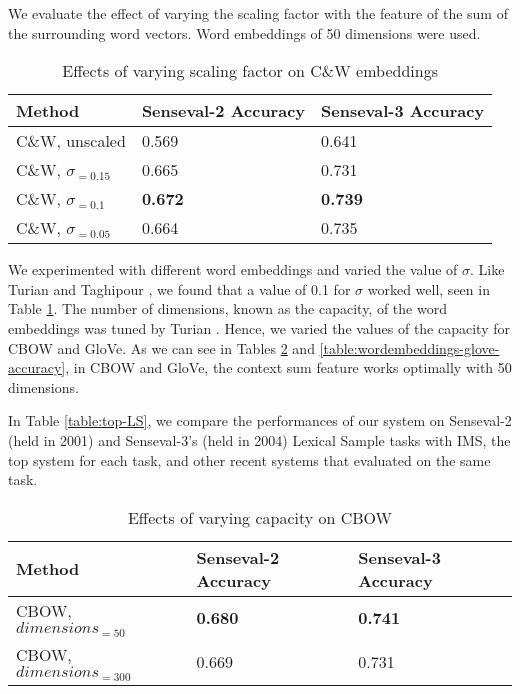 We evaluate the effect of varying the scaling factor with the feature of the sum of the surrounding word vectors. Word embeddings of 50 dimensions were used.



\begin{table}[ht]
	\caption{Effects of varying scaling factor on C\&W embeddings }
	\label{table:wordembeddings-accuracy}
	\begin{center}
		\begin{tabular}{| p{7cm} | p{4cm} | p{4cm} |}
			\hline
			Method & Senseval-2 Accuracy & Senseval-3 Accuracy \\
			\hline
			C\&W, unscaled & 0.569 & 0.641 \\
			\hline
			C\&W, $\sigma _{=0.15}$ & 0.665 & 0.731 \\
			\hline
			C\&W, $\sigma _{=0.1}$ & {\bf0.672} & {\bf0.739} \\
			\hline
			C\&W, $\sigma _{=0.05}$ & 0.664 & 0.735 \\
			\hline
			
		\end{tabular}
	\end{center}
\end{table}
We experimented with different word embeddings and varied the value of $\sigma$. Like Turian  and Taghipour , we found that a value of 0.1 for $\sigma$ worked well, seen in Table \ref{table:wordembeddings-accuracy}. The number of dimensions, known as the capacity, of the word embeddings was tuned by Turian . Hence, we varied the values of the capacity for CBOW and GloVe. As we can see in Tables \ref{table:wordembeddings-word2vec-accuracy} and \ref{table:wordembeddings-glove-accuracy}, in CBOW and GloVe, the context sum feature works optimally with 50 dimensions. 

In Table \ref{table:top-LS}, we compare the performances of our system on Senseval-2 (held in 2001) and Senseval-3's (held in 2004) Lexical Sample tasks with IMS, the top system for each task, and other recent systems that evaluated on the same task.


\begin{table}[ht]
	\caption{Effects of varying capacity on CBOW}
	\label{table:wordembeddings-word2vec-accuracy}
	\begin{center}
		\begin{tabular}{| p{7cm} | p{4cm} | p{4cm} |}
			\hline
			Method & Senseval-2 Accuracy & Senseval-3 Accuracy \\
			\hline
			CBOW, $dimensions_{=50}$ & {\bf0.680} & {\bf0.741} \\
			\hline
			CBOW, $dimensions_{=300}$ & 0.669 & 0.731 \\
			\hline
			
		\end{tabular}
	\end{center}
\end{table}

